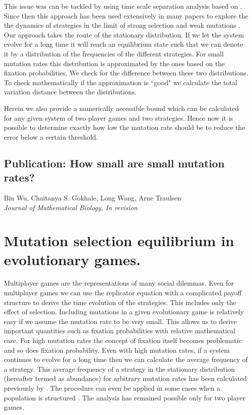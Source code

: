 \documentclass[oneside,11pt,a4paper]{book}
\begin{document}
This issue was can be tackled by using time scale separation analysis based on \citet{antal:2006aa}.
Since then this approach has been used extensively in many papers to explore the the dynamics of strategies in the limit of strong selection and weak mutations \citep{imhof:2005oz,fudenberg:2006ee,traulsen:2007bb,hauert:2007aa,hauert:2008bb,van-segbroeck:2009mi,sigmund:2010aa}.
Our approach takes the route of the stationary distribution.
If we let the system evolve for a long time it will reach an equilibrium state such that we can denote it by a distribution of the frequencies of the different strategies.
For small mutation rates this distribution is approximated by the ones based on the fixation probabilities.
We check for the difference between these two distributions.
To check mathematically if the approximation is ``good" we calculate the total variation distance between the distributions.%

Herein we also provide a numerically accessible bound which can be calculated for any given system of two player games and two strategies.
Hence now it is possible to determine exactly how low the mutation rate should be to reduce the error below a certain threshold.

\subsection{Publication: How small are small mutation rates?}

Bin Wu, Chaitanya S. Gokhale, Long Wang, Arne Traulsen\\
\textit{Journal of Mathematical Biology, In revision}



\section{Mutation selection equilibrium in evolutionary games.}
\label{sec:equilibrium}

\graphicspath{{Mu-Se/}{Mu-Se/}{Mu-Se/}}

Multiplayer games are the representations of many social dilemmas.
Even for multiplayer games we can use the replicator equation with a complicated payoff structure to derive the time evolution of the strategies.
This includes only the effect of selection.
Including mutations in a given evolutionary game is relatively easy if we assume the mutation rate to be very small.
This allows us to derive important quantities such as fixation probabilities with relative mathematical ease.
For high mutation rates the concept of fixation itself becomes problematic and so does fixation probability.
Even with high mutation rates, if a system continues to evolve for a long time then we can calculate the average frequency of a strategy.
This average frequency of a strategy in the stationary distribution (hereafter termed as abundance) for arbitrary mutation rates has been calculated previously by \citet{antal:2009th,antal:2009aa,antal:2009hc}.
The procedure can even be applied in some cases when a population is structured \citep{tarnita:2009jx}.
The analysis has remained possible only for two player games.
\end{document}
